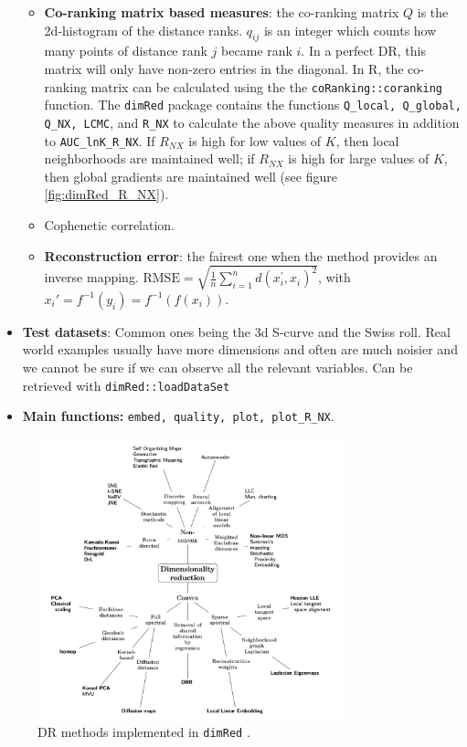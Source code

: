 \documentclass[a4paper,12pt]{article}
\begin{document}
\begin{itemize}
        \begin{itemize}
            \item \textbf{Co-ranking matrix based measures}: the co-ranking matrix $Q$ is the 2d-histogram of the distance ranks. $q_{ij}$ is an integer which counts how many points of distance rank $j$ became rank $i$. In a perfect DR, this matrix will only have non-zero entries in the
            diagonal. In R, the co-ranking matrix can be calculated using the the \texttt{coRanking::coranking} function. The \texttt{dimRed} package contains the functions \texttt{Q\_local, Q\_global, Q\_NX, LCMC}, and \texttt{R\_NX} to calculate the above quality measures in addition to \texttt{AUC\_lnK\_R\_NX}. If $R_{NX}$ is high for low values of $K$, then local neighborhoods are maintained well; if $R_{NX}$ is high for large values of $K$, then global gradients are maintained well (see figure \ref{fig:dimRed_R_NX}).
            \item Cophenetic correlation.
            \item \textbf{Reconstruction error}: the fairest one when the method provides an inverse mapping. $\mathrm{RMSE}=\sqrt{\frac{1}{n} \sum_{i=1}^n d\left(x_i^{\prime}, x_i\right)^2}$, with $x_i' = f^{-1}(y_i) = f^{-1}(f(x_i))$.
        \end{itemize}
    \item \textbf{Test datasets}: Common ones being the 3d S-curve and the Swiss roll. Real world examples usually have more dimensions and often are much noisier and we cannot be sure if we can observe all the relevant variables. Can be retrieved with \texttt{dimRed::loadDataSet}
    \item \textbf{Main functions:} \texttt{embed, quality, plot, plot\_R\_NX}.
\end{itemize}

\begin{figure}[ht]
    \centering
    \includegraphics[width=0.8\textwidth]{figures/dimRed_methods.png}
    \caption{DR methods implemented in \texttt{dimRed} \cite{Kraemer2018dimRedAC}.}
    \label{fig:dimRed_methods}
\end{figure}
\end{document}
